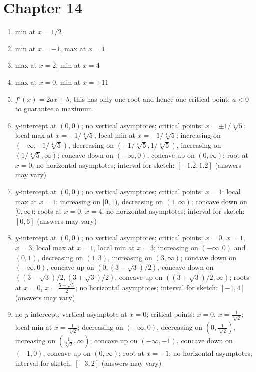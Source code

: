 \section*{Chapter 14}
\twocol
\begin{enumerate}
    \item min at $x=1/2$
    \item min at $x=-1$, max at $x=1$
    \item max at $x=2$, min at $x=4$
    \item max at $x=0$, min at $x=\pm 11$
    \item $f'(x) = 2ax + b$, this has only one root and hence one critical point; $a<0$ to guarantee a maximum.
    \item $y$-intercept at $(0,0)$; no vertical asymptotes; critical points:
    $x=\pm1/\sqrt[4]{5}$; local max at $x=-1/\sqrt[4]{5}$, local min at
    $x=-1/\sqrt[4]{5}$; increasing on $(-\infty,-1/\sqrt[4]{5})$, decreasing
    on $(-1/\sqrt[4]{5},1/\sqrt[4]{5})$, increasing on
    $(1/\sqrt[4]{5},\infty)$; concave down on $(-\infty,0)$, concave up on
    $(0, \infty)$; root at $x=0$; no horizontal asymptotes; interval for
    sketch: $[-1.2,1.2]$ (answers may vary)
    \item $y$-intercept at $(0,0)$; no vertical asymptotes; critical points: $x=
    1$; local max at $x=1$; increasing on $[0,1)$, decreasing on
      $(1,\infty)$; concave down on $[0,\infty)$; roots at $x=0$, $x=4$;
        no horizontal asymptotes; interval for sketch: $[0,6]$ (answers
        may vary)
    \item $y$-intercept at $(0,0)$; no vertical asymptotes; critical points:
    $x=0$, $x=1$, $x=3$; local max at $x=1$, local min at $x=3$;
    increasing on $(-\infty,0)$ and $(0,1)$, decreasing on $(1,3)$,
    increasing on $(3,\infty)$; concave down on $(-\infty,0)$, concave
    up on $(0, (3-\sqrt{3})/2)$, concave down on
    $((3-\sqrt{3})/2,(3+\sqrt{3})/2)$, concave up on
    $((3+\sqrt{3})/2,\infty)$; roots at $x=0$, $x= \frac{5\pm
      \sqrt{5}}{2}$; no horizontal asymptotes; interval for sketch:
    $[-1,4]$ (answers may vary)
    \item no $y$-intercept; vertical asymptote at $x=0$; critical points: $x=0$,
    $x=\frac{1}{\sqrt[3]{2}}$; local min at $x=\frac{1}{\sqrt[3]{2}}$;
    decreasing on $(-\infty,0)$, decreasing on
    $(0,\frac{1}{\sqrt[3]{2}})$, increasing on
    $(\frac{1}{\sqrt[3]{2}},\infty)$; concave up on $(-\infty,-1)$,
    concave down on $(-1,0)$, concave up on $(0,\infty)$; root at $x=-1$;
    no horizontal asymptotes; interval for sketch: $[-3,2]$ (answers may
    vary)
\end{enumerate}
\endtwocol

